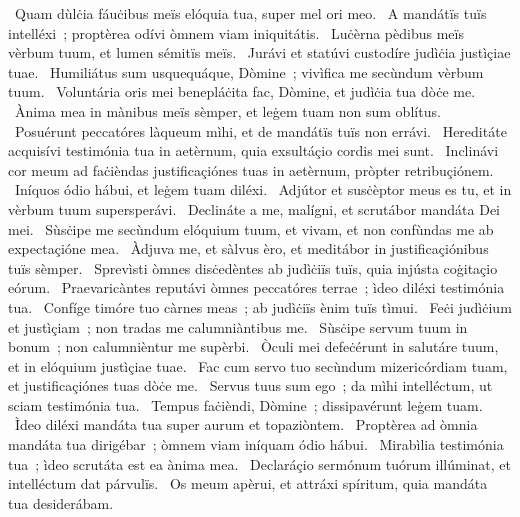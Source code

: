 {~Quam dùlċia fáuċibus meïs elóquia tua, super mel ori meo.
~A mandátïs tuïs intelléxi~; proptèrea odívi òmnem viam iniquitátis.
~Luċèrna pèdibus meïs vèrbum tuum, et lumen sémitïs meïs.
~Jurávi et statúvi custodíre judìċia justìçiae tuae.
~Humiliátus sum usquequáque, Dòmine~; vivìfica me secùndum vèrbum tuum.
~Voluntária oris mei benepláċita fac, Dòmine, et judìċia tua dòċe me.
~Ànima mea in mànibus meïs sèmper, et leġem tuam non sum oblítus.
~Posuérunt peccatóres làqueum mìhi, et de mandátïs tuïs non errávi.
~Hereditáte acquisívi testimónia tua in aetèrnum, quia exsultáçio cordis mei sunt.
~Inclinávi cor meum ad faċièndas justificaçiónes tuas in aetèrnum, pròpter retribuçiónem.
~Iníquos ódio hábui, et leġem tuam diléxi.
~Adjútor et susċèptor meus es tu, et in vèrbum tuum supersperávi.
~Declináte a me, malígni, et scrutábor mandáta Dei mei.
~Sùsċipe me secùndum elóquium tuum, et vivam, et non confùndas me ab expectaçióne mea.
~Àdjuva me, et sàlvus èro, et meditábor in justificaçiónibus tuïs sèmper.
~Sprevìsti òmnes disċedèntes ab judìċiïs tuïs, quia injústa coġitaçio eórum.
~Praevaricàntes reputávi òmnes peccatóres terrae~; ìdeo diléxi testimónia tua.
~Confíge timóre tuo càrnes meas~; ab judìċiïs ènim tuïs tìmui.
~Feċi judìċium et justìçiam~; non tradas me calumniàntibus me.
~Sùsċipe servum tuum in bonum~; non calumnièntur me supèrbi.
~Òculi mei defeċérunt in salutáre tuum, et in elóquium justìçiae tuae.
~Fac cum servo tuo secùndum mizericórdiam tuam, et justificaçiónes tuas dòċe me.
~Servus tuus sum ego~; da mìhi intelléctum, ut sciam testimónia tua.
~Tempus faċièndi, Dòmine~; dissipavérunt leġem tuam.
~Ìdeo diléxi mandáta tua super aurum et topaziòntem.
~Proptèrea ad òmnia mandáta tua dirigébar~; òmnem viam iníquam ódio hábui.
~Mirabìlia testimónia tua~; ìdeo scrutáta est ea ànima mea.
~Declaráçio sermónum tuórum illúminat, et intelléctum dat párvulïs.
~Os meum apèrui, et attráxi spíritum, quia mandáta tua desiderábam.
}
